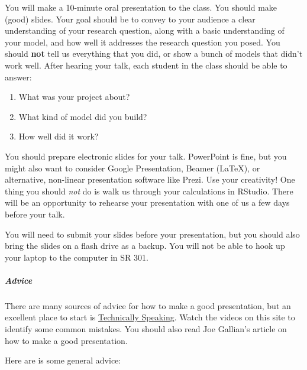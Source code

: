 \documentclass[]{article}
\let\oldsubparagraph\subparagraph
\renewcommand{\subparagraph}[1]{\oldsubparagraph{#1}\mbox{}}
\begin{document}
You will make a 10-minute oral presentation to the class. You should
make (good) slides. Your goal should be to convey to your audience a
clear understanding of your research question, along with a basic
understanding of your model, and how well it addresses the research
question you posed. You should \textbf{not} tell us everything that you
did, or show a bunch of models that didn't work well. After hearing your
talk, each student in the class should be able to answer:

\begin{enumerate}
\def\labelenumi{\arabic{enumi}.}
\item
  What was your project about?
\item
  What kind of model did you build?
\item
  How well did it work?
\end{enumerate}

You should prepare electronic slides for your talk. PowerPoint is fine,
but you might also want to consider Google Presentation, Beamer (LaTeX),
or alternative, non-linear presentation software like Prezi. Use your
creativity! One thing you should \emph{not} do is walk us through your
calculations in RStudio. There will be an opportunity to rehearse your
presentation with one of us a few days before your talk.

You will need to submit your slides before your presentation, but you
should also bring the slides on a flash drive as a backup. You will not
be able to hook up your laptop to the computer in SR 301.

\subparagraph{Advice}\label{advice}

There are many sources of advice for how to make a good presentation,
but an excellent place to start is
\href{http://techspeaking.denison.edu/}{Technically Speaking}. Watch the
videos on this site to identify some common mistakes. You should also
read Joe Gallian's article on how to make a good presentation.

Here are is some general advice:
\end{document}
